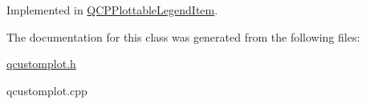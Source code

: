 Implemented in \hyperlink{classQCPPlottableLegendItem_af79ab526cc79f4ea5d9c601d139b2166}{Q\-C\-P\-Plottable\-Legend\-Item}.



The documentation for this class was generated from the following files\-:\begin{DoxyCompactItemize}
\item 
\hyperlink{qcustomplot_8h}{qcustomplot.\-h}\item 
qcustomplot.\-cpp\end{DoxyCompactItemize}

